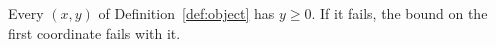 
\begin{assumption}\label{ass:leaf}
Every  $(x, y)$ of Definition~\ref{def:object} has $y \ge 0$. If
it fails, the bound on the first coordinate fails with it.
\end{assumption}
